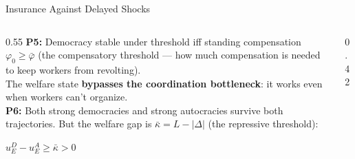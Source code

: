\documentclass[
  ignorenonframetext,
  aspectratio=169]{beamer}
\begin{document}
\begin{frame}{Insurance Against Delayed Shocks}
\protect{}\label{insurance-against-delayed-shocks}
\begin{columns}[T]
\begin{column}{0.55\textwidth}
\textbf{P5:} Democracy stable under threshold iff standing compensation $\varphi_0 \geq \bar{\varphi}$ (the compensatory threshold --- how much compensation is needed to keep workers from revolting).\\[4pt]

The welfare state \textbf{bypasses the coordination bottleneck}: it works even when workers can't organize.\\[4pt]

\textbf{P6:} Both strong democracies and strong autocracies survive both trajectories. But the welfare gap is $\bar{\kappa} = L - |\Delta|$ (the repressive threshold):
\vspace{0.1cm}
\centerline{$u_E^D - u_E^A \geq \bar{\kappa} > 0$}
\end{column}
\begin{column}{0.42\textwidth}
\begin{center}
\end{center}
\end{column}
\end{columns}
\end{frame}
\end{document}
